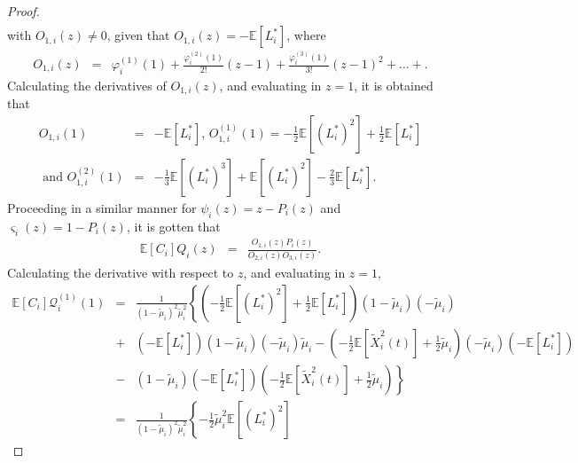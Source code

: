 \documentclass{article}
\newcommand{\esp}{\mathbb{E}}
\begin{document}
\begin{proof}
\begin{eqnarray*}
\end{eqnarray*}
with $O_{1,i}\left(z\right)\neq0$, given that $O_{1,i}\left(z\right)=-\esp\left[L^{*}_{i}\right]$, where
\begin{eqnarray}
O_{1,i}\left(z\right)&=&\varphi_{i}^{(1)}\left(1\right)+\frac{\varphi_{i}^{(2)}\left(1\right)}{2!}\left(z-1\right)+\frac{\varphi_{i}^{(3)}\left(1\right)}{3!}\left(z-1\right)^{2}+\ldots+.
\end{eqnarray}
Calculating the derivatives of $O_{1,i}\left(z\right)$, and evaluating in $z=1$, it is obtained that 
\begin{eqnarray*}
O_{1,i}\left(1\right)&=&-\esp\left[L_{i}^{*}\right]\textrm{, }O_{1,i}^{(1)}\left(1\right)=-\frac{1}{2}\esp\left[(L_{i}^{*})^{2}\right]+\frac{1}{2}\esp\left[L_{i}^{*}\right]\\
\textrm{ and }O_{1,i}^{(2)}\left(1\right)&=&-\frac{1}{3}\esp\left[(L_{i}^{*})^{3}\right]+\esp\left[(L_{i}^{*})^{2}\right]-\frac{2}{3}\esp\left[L_{i}^{*}\right].
\end{eqnarray*}
Proceeding in a similar manner for $\psi_{i}\left(z\right)=z-P_{i}\left(z\right)$ and $\varsigma_{i}\left(z\right)=1-P_{i}\left(z\right)$, it is gotten that
\begin{eqnarray}
\esp\left[C_{i}\right]Q_{i}\left(z\right)&=&\frac{O_{1,i}\left(z\right)P_{i}\left(z\right)}{O_{2,i}\left(z\right)O_{3,i}\left(z\right)}.
\end{eqnarray}
Calculating the derivative with respect to $z$, and evaluating in $z=1$,
\begin{eqnarray*}\label{Ec.Primer.Derivada.Q}
\esp\left[C_{i}\right]\mathcal{Q}_{i}^{(1)}\left(1\right)
&=&\frac{1}{\left(1-\tilde{\mu}_{i}\right)^{2}\tilde{\mu}_{i}^{2}}\left\{\left(-\frac{1}{2}\esp \left[(L_{i}^{*})^{2}\right]+\frac{1}{2}\esp\left[L_{i}^{*}\right]\right)\left(1-\tilde{\mu}_{i}\right)\left(-\tilde{\mu}_{i}\right)\right.\\
&+&\left.
\left(-\esp\left[ L_{i}^{*}\right]\right)\left(1-\tilde{\mu}_{i}\right)\left(-\tilde{\mu}_{i}\right)\tilde{\mu}_{i}%
-\left(-\frac{1}{2}\esp\left[\tilde{X}_{i}^{2}\left(t\right)\right]+\frac{1}{2}\tilde{\mu}_{i}\right)\left(-\tilde{\mu}_{i}\right)\left(-\esp\left[ L_{i}^{*}\right]\right)\right.\\
&-&\left.\left(1-\tilde{\mu}_{i}\right)\left(-\esp\left[ L_{i}^{*}\right]\right)\left(-\frac{1}{2}\esp\left[\tilde{X}_{i}^{2}\left(t\right)\right]+\frac{1}{2}\tilde{\mu}_{i}\right)\right\}\\
&=&\frac{1}{\left(1-\tilde{\mu}_{i}\right)^{2}\tilde{\mu}_{i}^{2}}\left\{-\frac{1}{2}\tilde{\mu}_{i}^{2}\esp\left[ (L_{i}^{*})^{2}\right]

\end{eqnarray*}
\end{proof}
\end{document}
